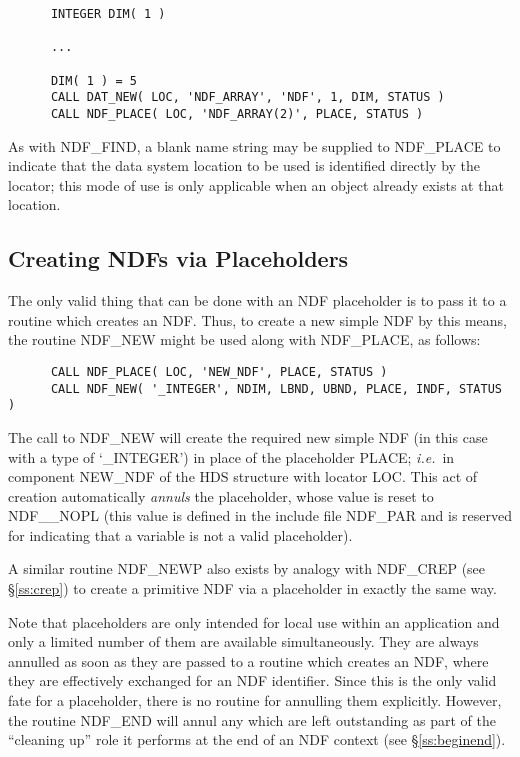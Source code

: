 \documentclass[twoside,11pt]{article}
\newcommand{\htmlref}[2]{#1}
\newcommand{\xref}[3]{#1}
\newcommand{\xlabel}[1]{}
\newcommand{\st}[1]{{\em{#1}}}
\begin{document}
\small
\begin{verbatim}
      INTEGER DIM( 1 )

      ...

      DIM( 1 ) = 5
      CALL DAT_NEW( LOC, 'NDF_ARRAY', 'NDF', 1, DIM, STATUS )
      CALL NDF_PLACE( LOC, 'NDF_ARRAY(2)', PLACE, STATUS )
\end{verbatim}
\normalsize

As with \htmlref{NDF\_FIND}{NDF_FIND}, a blank name string may be supplied to NDF\_PLACE
to indicate that the data system location to be used is identified
directly by the locator; this mode of use is only applicable when an
object already exists at that location.

\subsection{\xlabel{creating_ndfs_via_placeholders}Creating NDFs via Placeholders}

The only valid thing that can be done with an NDF placeholder is to pass it
to a routine which creates an NDF. 
Thus, to create a new simple NDF by this means, the routine \htmlref{NDF\_NEW}{NDF_NEW} might
be used along with \htmlref{NDF\_PLACE}{NDF_PLACE}, as follows: 

\small
\begin{verbatim}
      CALL NDF_PLACE( LOC, 'NEW_NDF', PLACE, STATUS )
      CALL NDF_NEW( '_INTEGER', NDIM, LBND, UBND, PLACE, INDF, STATUS )
\end{verbatim}
\normalsize

The call to NDF\_NEW will create the required new simple NDF (in this case
with a type of `\_INTEGER') in place of the placeholder PLACE; \st{i.e.}\ in
component NEW\_NDF of the \xref{HDS}{sun92}{} structure with
\xref{locator}{sun92}{using_locators} LOC.
This act of creation automatically \st{annuls\/} the placeholder, whose value
is reset to NDF\_\_NOPL (this value is defined in the include file NDF\_PAR
and is reserved for indicating that a variable is not a valid placeholder). 

A similar routine \htmlref{NDF\_NEWP}{NDF_NEWP} also exists by analogy with \htmlref{NDF\_CREP}{NDF_CREP} (see
\S\ref{ss:crep}) to create a primitive NDF via a placeholder in exactly the
same way. 

Note that placeholders are only intended for local use within an
application and only a limited number of them are available simultaneously.
They are always annulled as soon as they are passed to a routine which 
creates an NDF, where they are effectively exchanged for an NDF identifier.
Since this is the only valid fate for a placeholder, there is no routine for
annulling them explicitly.
However, the routine \htmlref{NDF\_END}{NDF_END} will annul any which are left outstanding as
part of the ``cleaning up'' role it performs at the end of an NDF context
(see \S\ref{ss:beginend}). 
\end{document}
